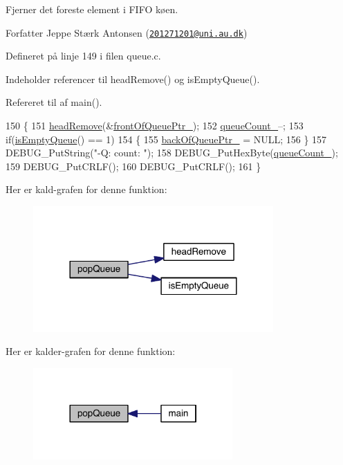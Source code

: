 Fjerner det foreste element i F\+I\+FO køen.

\begin{DoxyAuthor}{Forfatter}
Jeppe Stærk Antonsen (\href{mailto:201271201@uni.au.dk}{\tt 201271201@uni.\+au.\+dk}) 
\end{DoxyAuthor}


Defineret på linje 149 i filen queue.\+c.



Indeholder referencer til head\+Remove() og is\+Empty\+Queue().



Refereret til af main().


\begin{DoxyCode}
150 \{
151   \hyperlink{class_queue_ae54666c891fd21d5497f48c385a00b74}{headRemove}(&\hyperlink{class_queue_aa48f05218d0a78402821c8aa9bdad06a}{frontOfQueuePtr\_});
152   \hyperlink{class_queue_ad260f9ccca00e80d161bbf3e70c3ffa6}{queueCount\_}--;
153   \textcolor{keywordflow}{if}(\hyperlink{class_queue_aafb324c79731abdc228dbf94d86722a3}{isEmptyQueue}() == 1)
154   \{
155     \hyperlink{class_queue_a225d2c9ad4e83d6da443e99b8869a51c}{backOfQueuePtr\_} = NULL;
156   \}
157   DEBUG\_PutString(\textcolor{stringliteral}{"-Q: count: "});
158   DEBUG\_PutHexByte(\hyperlink{class_queue_ad260f9ccca00e80d161bbf3e70c3ffa6}{queueCount\_});
159   DEBUG\_PutCRLF();
160   DEBUG\_PutCRLF();
161 \}
\end{DoxyCode}


Her er kald-\/grafen for denne funktion\+:
\nopagebreak
\begin{figure}[H]
\begin{center}
\leavevmode
\includegraphics[width=260pt]{d4/da4/class_queue_a9ecab9ecdedfc331aed9a0ae63ce193b_cgraph}
\end{center}
\end{figure}




Her er kalder-\/grafen for denne funktion\+:
\nopagebreak
\begin{figure}[H]
\begin{center}
\leavevmode
\includegraphics[width=216pt]{d4/da4/class_queue_a9ecab9ecdedfc331aed9a0ae63ce193b_icgraph}
\end{center}
\end{figure}


